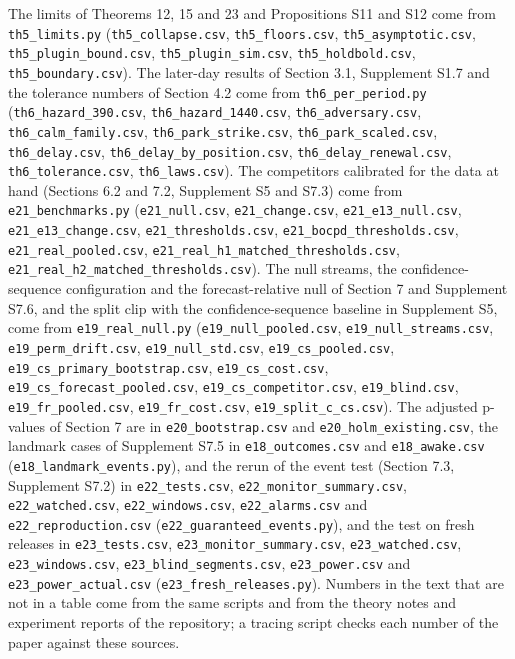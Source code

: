 \documentclass[
]{article}
\begin{document}
The limits of Theorems 12, 15 and 23 and Propositions S11 and S12 come
from \texttt{th5\_limits.py} (\texttt{th5\_collapse.csv},
\texttt{th5\_floors.csv}, \texttt{th5\_asymptotic.csv},
\texttt{th5\_plugin\_bound.csv}, \texttt{th5\_plugin\_sim.csv},
\texttt{th5\_holdbold.csv}, \texttt{th5\_boundary.csv}). The later-day
results of Section 3.1, Supplement S1.7 and the tolerance numbers of
Section 4.2 come from \texttt{th6\_per\_period.py}
(\texttt{th6\_hazard\_390.csv}, \texttt{th6\_hazard\_1440.csv},
\texttt{th6\_adversary.csv}, \texttt{th6\_calm\_family.csv},
\texttt{th6\_park\_strike.csv}, \texttt{th6\_park\_scaled.csv},
\texttt{th6\_delay.csv}, \texttt{th6\_delay\_by\_position.csv},
\texttt{th6\_delay\_renewal.csv}, \texttt{th6\_tolerance.csv},
\texttt{th6\_laws.csv}). The competitors calibrated for the data at hand
(Sections 6.2 and 7.2, Supplement S5 and S7.3) come from
\texttt{e21\_benchmarks.py} (\texttt{e21\_null.csv},
\texttt{e21\_change.csv}, \texttt{e21\_e13\_null.csv},
\texttt{e21\_e13\_change.csv}, \texttt{e21\_thresholds.csv},
\texttt{e21\_bocpd\_thresholds.csv}, \texttt{e21\_real\_pooled.csv},
\texttt{e21\_real\_h1\_matched\_thresholds.csv},
\texttt{e21\_real\_h2\_matched\_thresholds.csv}). The null streams, the
confidence-sequence configuration and the forecast-relative null of
Section 7 and Supplement S7.6, and the split clip with the
confidence-sequence baseline in Supplement S5, come from
\texttt{e19\_real\_null.py} (\texttt{e19\_null\_pooled.csv},
\texttt{e19\_null\_streams.csv}, \texttt{e19\_perm\_drift.csv},
\texttt{e19\_null\_std.csv}, \texttt{e19\_cs\_pooled.csv},
\texttt{e19\_cs\_primary\_bootstrap.csv}, \texttt{e19\_cs\_cost.csv},
\texttt{e19\_cs\_forecast\_pooled.csv},
\texttt{e19\_cs\_competitor.csv}, \texttt{e19\_blind.csv},
\texttt{e19\_fr\_pooled.csv}, \texttt{e19\_fr\_cost.csv},
\texttt{e19\_split\_c\_cs.csv}). The adjusted p-values of Section 7 are
in \texttt{e20\_bootstrap.csv} and \texttt{e20\_holm\_existing.csv}, the
landmark cases of Supplement S7.5 in \texttt{e18\_outcomes.csv} and
\texttt{e18\_awake.csv} (\texttt{e18\_landmark\_events.py}), and the
rerun of the event test (Section 7.3, Supplement S7.2) in
\texttt{e22\_tests.csv}, \texttt{e22\_monitor\_summary.csv},
\texttt{e22\_watched.csv}, \texttt{e22\_windows.csv},
\texttt{e22\_alarms.csv} and \texttt{e22\_reproduction.csv}
(\texttt{e22\_guaranteed\_events.py}), and the test on fresh releases in
\texttt{e23\_tests.csv}, \texttt{e23\_monitor\_summary.csv},
\texttt{e23\_watched.csv}, \texttt{e23\_windows.csv},
\texttt{e23\_blind\_segments.csv}, \texttt{e23\_power.csv} and
\texttt{e23\_power\_actual.csv} (\texttt{e23\_fresh\_releases.py}).
Numbers in the text that are not in a table come from the same scripts
and from the theory notes and experiment reports of the repository; a
tracing script checks each number of the paper against these sources.
\end{document}
